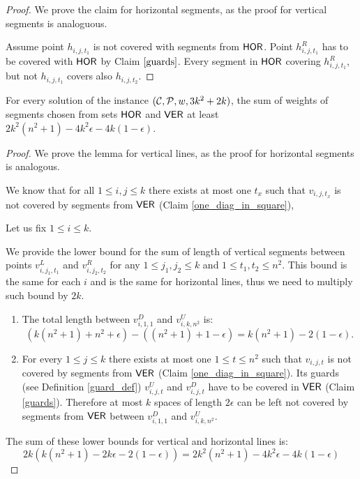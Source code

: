 {{{{\begin{proof}
We prove the claim for horizontal segments,
as the proof for vertical segments is analoguous.

Assume point $h_{i, j, t_1}$ is not covered with
segments from $\mathsf{HOR}$.
Point $h^R_{i, j, t_1}$ has to be covered with $\mathsf{HOR}$
by Claim $\ref{guards}$.
Every segment in $\mathsf{HOR}$ covering $h^R_{i, j, t_1}$,
but not $h_{i,j,t_1}$ covers also $h_{i, j, t_2}$.
\end{proof}

\begin{lemma}
\label{vertical_horizontal_sum}
For every solution of the instance $(\mathcal{C}, \mathcal{P}, w, 3k^2+2k)$,
the sum of weights of segments chosen
from sets $\mathsf{HOR}$ and $\mathsf{VER}$ at least
$2k^2(n^2+1) -4k^2\epsilon -4k(1-\epsilon)$.
\end{lemma}

\begin{proof}
We prove the lemma for vertical lines,
as the proof for horizontal segments is analogous.

We know that for all $1 \le i,j \le k$
there exists at most one $t_x$ such that
$v_{i,j,t_x}$ is not covered by
segments from $\mathsf{VER}$ (Claim \ref{one_diag_in_square}),

Let us fix $1 \le i \le k$.

We provide the lower bound for the sum of length
of vertical segments between points $v_{i,j_1,t_1}^L$ and $v_{i,j_2,t_2}^R$
for any $1\le j_1, j_2 \le k$ and $1 \le t_1, t_2 \le n^2$.
This bound is the same for each $i$ and is the same
for horizontal lines, thus we need to multiply such bound by $2k$.

\begin{enumerate}[label={(\arabic*)}]
\item The total length between $v^D_{i, 1, 1}$ and $v^U_{i, k, n^2}$ is:
$$(k(n^2+1) + n^2 +\epsilon) - ((n^2+1)+1 -\epsilon) = k(n^2+1) - 2(1 - \epsilon).$$

\item For every $1 \le j \le k$ there exists at most one $1 \le t \le n^2$
such that $v_{i,j,t}$ is not covered by segments from $\mathsf{VER}$
(Claim \ref{one_diag_in_square}).
Its guards (see Definition \ref{guard_def}) $v^U_{i,j,t}$ and $v^D_{i,j,t}$
have to be covered in $\mathsf{VER}$ (Claim \ref{guards}).
Therefore at most $k$ spaces of length $2\epsilon$ can be left
not covered by segments from $\mathsf{VER}$ between $v_{i,1,1}^D$ and $v_{i,k,n^2}^U$.

\end{enumerate}
The sum of these lower bounds for vertical and horizontal lines is:
$$2k(k(n^2+1) -2k\epsilon -2(1-\epsilon)) = 2k^2(n^2+1) -4k^2\epsilon -4k(1-\epsilon)$$
\end{proof}

}}}}
